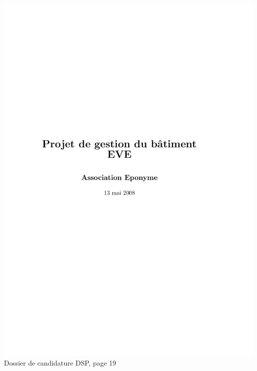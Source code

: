 \includegraphics[scale=0.85,trim=20mm 20mm 20mm 20mm,clip,page=19]{annexes/candidature_dsp.pdf} \\
Dossier de candidature DSP, page 19
\newpage
